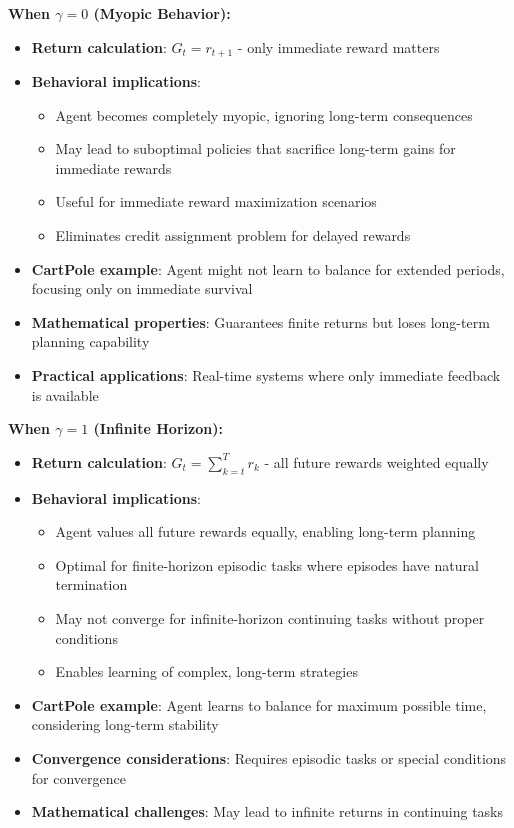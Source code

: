 \documentclass[12pt]{article}
\begin{document}
{{{\textbf{When $\gamma = 0$ (Myopic Behavior):}
\begin{itemize}
    \item \textbf{Return calculation}: $G_t = r_{t+1}$ - only immediate reward matters
    \item \textbf{Behavioral implications}: 
    \begin{itemize}
        \item Agent becomes completely myopic, ignoring long-term consequences
        \item May lead to suboptimal policies that sacrifice long-term gains for immediate rewards
        \item Useful for immediate reward maximization scenarios
        \item Eliminates credit assignment problem for delayed rewards
    \end{itemize}
    \item \textbf{CartPole example}: Agent might not learn to balance for extended periods, focusing only on immediate survival
    \item \textbf{Mathematical properties}: Guarantees finite returns but loses long-term planning capability
    \item \textbf{Practical applications}: Real-time systems where only immediate feedback is available
\end{itemize}

\textbf{When $\gamma = 1$ (Infinite Horizon):}
\begin{itemize}
    \item \textbf{Return calculation}: $G_t = \sum_{k=t}^{T} r_k$ - all future rewards weighted equally
    \item \textbf{Behavioral implications}:
    \begin{itemize}
        \item Agent values all future rewards equally, enabling long-term planning
        \item Optimal for finite-horizon episodic tasks where episodes have natural termination
        \item May not converge for infinite-horizon continuing tasks without proper conditions
        \item Enables learning of complex, long-term strategies
    \end{itemize}
    \item \textbf{CartPole example}: Agent learns to balance for maximum possible time, considering long-term stability
    \item \textbf{Convergence considerations}: Requires episodic tasks or special conditions for convergence
    \item \textbf{Mathematical challenges}: May lead to infinite returns in continuing tasks
\end{itemize}

}}}
\end{document}
